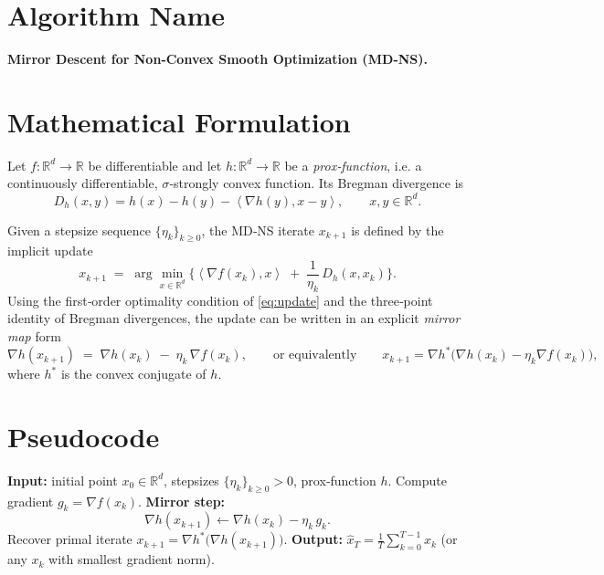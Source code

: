 \documentclass[11pt]{article}
\newcommand{\inner}[2]{\left\langle #1,#2\right\rangle}
\newcommand{\D}[2]{D_{h}(#1,#2)}
\begin{document}
\section*{Algorithm Name}
\textbf{Mirror Descent for Non‑Convex Smooth Optimization (MD‑NS).}

\section*{Mathematical Formulation}
Let $f:\mathbb{R}^{d}\rightarrow\mathbb{R}$ be differentiable and let $h:\mathbb{R}^{d}\rightarrow\mathbb{R}$ be a \emph{prox‑function}, i.e. a continuously differentiable, $\sigma$‑strongly convex function.  
Its Bregman divergence is
\[
\D{x}{y}=h(x)-h(y)-\inner{\nabla h(y)}{x-y},\qquad x,y\in\mathbb{R}^{d}.
\]

Given a stepsize sequence $\{\eta_{k}\}_{k\ge 0}$, the MD‑NS iterate $x_{k+1}$ is defined by the implicit update
\begin{equation}
\label{eq:update}
x_{k+1}
\;=\;
\arg\min_{x\in\mathbb{R}^{d}}
\Big\{
\inner{\nabla f(x_{k})}{x}
\;+\;
\frac{1}{\eta_{k}}\,\D{x}{x_{k}}
\Big\}.
\end{equation}
Using the first‑order optimality condition of \eqref{eq:update} and the three‑point identity of Bregman divergences, the update can be written in an explicit \emph{mirror map} form
\begin{equation}
\label{eq:mirror}
\nabla h(x_{k+1})
\;=\;
\nabla h(x_{k})\;-\;\eta_{k}\,\nabla f(x_{k}),
\qquad\text{or equivalently}\qquad
x_{k+1}= \nabla h^{*}\!\big(\nabla h(x_{k})-\eta_{k}\nabla f(x_{k})\big),
\end{equation}
where $h^{*}$ is the convex conjugate of $h$.

\section*{Pseudocode}
\begin{algorithm}[H]
\caption{Mirror Descent for Non‑Convex Smooth Optimization}
\begin{algorithmic}[1]
\STATE \textbf{Input:} initial point $x_{0}\in\mathbb{R}^{d}$, stepsizes $\{\eta_{k}\}_{k\ge0}>0$, prox‑function $h$.
\STATE Compute gradient $g_{k}= \nabla f(x_{k})$.
\STATE \textbf{Mirror step:}
\[
    \nabla h(x_{k+1})\gets \nabla h(x_{k})-\eta_{k}\,g_{k}.
\]
\STATE Recover primal iterate $x_{k+1}= \nabla h^{*}\big(\nabla h(x_{k+1})\big)$.
\ENDFOR
\STATE \textbf{Output:} $\displaystyle \hat{x}_{T}= \frac{1}{T}\sum_{k=0}^{T-1}x_{k}$ (or any $x_{k}$ with smallest gradient norm).
\end{algorithmic}
\end{algorithm}
\end{document}
